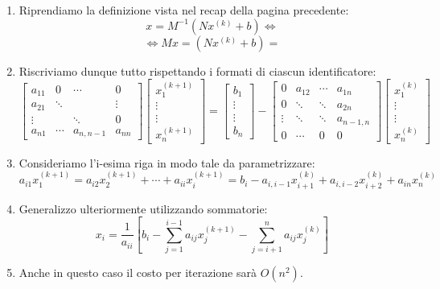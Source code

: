 \documentclass{article}
\begin{document}
\begin{enumerate}
    \item Riprendiamo la definizione vista nel recap della pagina precedente:
        \[ x = M^{-1}(Nx^{(k)} + b) \Leftrightarrow \]
        \vspace*{-12px}
        \[ \Leftrightarrow Mx = (Nx^{(k)} + b)  = \]
        \item Riscriviamo dunque tutto rispettando i formati di ciascun identificatore:
        \vspace*{8px}
        \[  \begin{bmatrix}
            a_{11} & 0 & \cdots & 0 \\
            a_{21} & \ddots &  & \vdots \\
            \vdots &  & \ddots & 0 \\
            a_{n1} & \cdots & a_{n,n-1} & a_{nn}
            \end{bmatrix}
            \begin{bmatrix}
                x^{(k+1)}_{1} \\
                \vdots \\
                \vdots \\
                x^{(k+1)}_{n} 
            \end{bmatrix} 
            =
            \begin{bmatrix}
                b_{1} \\
                \vdots \\
                \vdots \\
                b_{n} 
            \end{bmatrix}
            -
            \begin{bmatrix}
                0 & a_{12} & \cdots & a_{1n} \\
                0 & \ddots & \ddots & a_{2n} \\
                \vdots & \ddots & \ddots & a_{n-1,n} \\
                0 & \cdots & 0 & 0
            \end{bmatrix}
            \begin{bmatrix}
                x^{(k)}_{1} \\
                \vdots \\
                \vdots \\
                x^{(k)}_{n} 
            \end{bmatrix}
        \]
        \item Consideriamo l'i-esima riga in modo tale da parametrizzare: 
        \[ a_{i1}x^{(k+1)}_{1} = a_{i2}x^{(k+1)}_{2} + \cdots + a_{ii}x^{(k+1)}_{i} = b_{i} - a_{i,i-1}x^{(k)}_{i+1} + a_{i,i-2}x^{(k)}_{i+2} + a_{in}x^{(k)}_{n} \]
        \item Generalizzo ulteriormente utilizzando sommatorie:
        \[ x_{i} = \frac{1}{a_{ii}} \left[ b_{i} - \sum_{j=1}^{i-1} a_{ij}x^{(k+1)}_{j} - \sum_{j=i+1}^{n} a_{ij}x^{(k)}_{j} \right] \]
        \item Anche in questo caso il costo per iterazione sarà $O(n^{2})$.
    
\end{enumerate}
\end{document}
